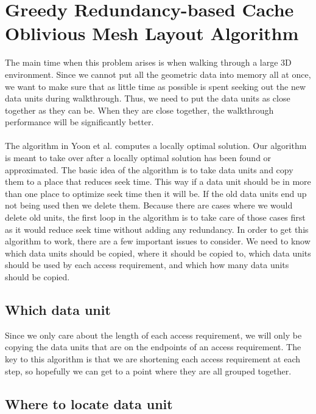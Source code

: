 \documentclass[11pt,psfig]{article}
\begin{document}
\section*{Greedy Redundancy-based Cache Oblivious Mesh Layout Algorithm}

The main time when this problem arises is when walking through a large 3D environment. Since we cannot put all the geometric data into memory all at once, we want to make sure that as little time as possible is spent seeking out the new data units during walkthrough. Thus, we need to put the data units as close together as they can be. When they are close together, the walkthrough performance will be significantly better. \\
\\
The algorithm in Yoon et al. computes a locally optimal solution. Our algorithm is meant to take over after a locally optimal solution has been found or approximated. The basic idea of the algorithm is to take data units and copy them to a place that reduces seek time. This way if a data unit should be in more than one place to optimize seek time then it will be. If the old data units end up not being used then we delete them. Because there are cases where we would delete old units, the first loop in the algorithm is to take care of those cases first as it would reduce seek time without adding any redundancy. In order to get this algorithm to work, there are a few important issues to consider. We need to know which data units should be copied, where it should be copied to, which data units should be used by each access requirement, and which how many data units should be copied. 

\subsection*{Which data unit}

Since we only care about the length of each access requirement, we will only be copying the data units that are on the endpoints of an access requirement. The key to this algorithm is that we are shortening each access requirement at each step, so hopefully we can get to a point where they are all grouped together. 

\subsection*{Where to locate data unit}
\end{document}
